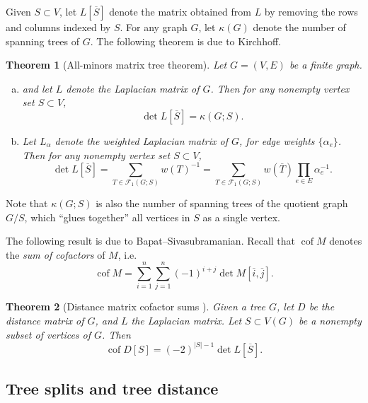 \documentclass{amsart}
\newtheorem{thm}{Theorem}
\theoremstyle{definition}
\DeclareMathOperator{\cof}{cof}
\newcommand{\trees}{\mathcal{F}_1}
\begin{document}
Given $S \subset V$,
let $L[\overline S]$ denote the matrix obtained from $L$ by removing the rows and columns indexed by $S$.
For any graph $G$, let $\kappa(G)$ denote the number of spanning trees of $G$.
The following theorem is due to Kirchhoff.
\begin{thm}[All-minors matrix tree theorem]
\label{thm:matrix-tree}
Let $G = (V,E)$ be a finite graph.
\begin{enumerate}[(a)]
\item 
and let $L$ denote the Laplacian matrix of $G$.
Then for any nonempty vertex set $S \subset V$,
\begin{equation}
\det L[\overline S] = \kappa( G ; S) .
\end{equation}

\item 
Let $L_\alpha$ denote the weighted Laplacian matrix of $G$, for edge weights $\{\alpha_e\}$. 
Then for any nonempty vertex set $S \subset V$,
\begin{equation}
\det L[\overline S] = \sum_{T \in \trees( G ; S)} w(T)^{-1}
= \sum_{T \in \trees(G; S)} w(\overline{T}) \prod_{e \in E} \alpha_e^{-1} .
\end{equation}
\end{enumerate}
\end{thm}
Note that $\kappa(G;S)$ is also the number of 
spanning trees of the quotient graph $G / S$, which ``glues together'' all vertices in $S$ as a single vertex.

The following result is due to Bapat--Sivasubramanian.
Recall that $\cof M$ denotes the {\em sum of cofactors} of $M$, i.e. 
\[
	\cof M = \sum_{i = 1}^{n} \sum_{j = 1}^{n} (-1)^{i + j} \det M[\overline{i},\overline{j}].
\]

\begin{thm}[Distance matrix cofactor sums \cite{bapat-sivasubramanian}]
Given a tree $G$,
let $D$ be the distance matrix of $G$, and $L$ the Laplacian matrix.
Let $S \subset V(G)$ be a nonempty subset of vertices of $G$. 
Then
\begin{equation*}
\cof D[S] = (-2)^{|S|-1} \det L[\overline S] .
\end{equation*}
\end{thm}


\subsection{Tree splits and tree distance}
\label{sec:tree-splits}
\end{document}
